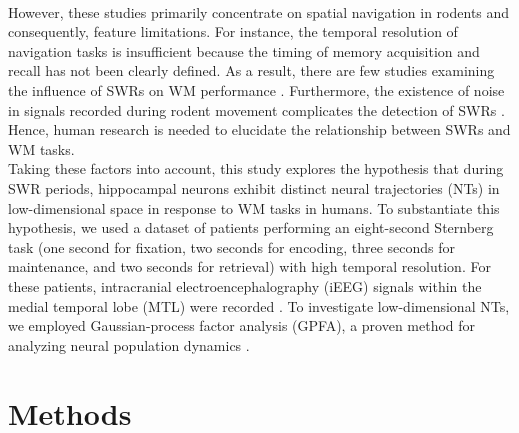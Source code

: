 \documentclass[final,3p,times,twocolumn]{elsarticle}
\begin{document}
\\
\indent
However, these studies primarily concentrate on spatial navigation in rodents and consequently, feature limitations. For instance, the temporal resolution of navigation tasks is insufficient because the timing of memory acquisition and recall has not been clearly defined. As a result, there are few studies examining the influence of SWRs on WM performance \cite{jadhav_awake_2012}. Furthermore, the existence of noise in signals recorded during rodent movement complicates the detection of SWRs \cite{Watanabe_2021}. Hence, human research is needed to elucidate the relationship between SWRs and WM tasks.
\\
\indent
Taking these factors into account, this study explores the hypothesis that during SWR periods, hippocampal neurons exhibit distinct neural trajectories (NTs) in low-dimensional space in response to WM tasks in humans. To substantiate this hypothesis, we used a dataset of patients performing an eight-second Sternberg task (one second for fixation, two seconds for encoding, three seconds for maintenance, and two seconds for retrieval) with high temporal resolution. For these patients, intracranial electroencephalography (iEEG) signals within the medial temporal lobe (MTL) were recorded \cite{boran_dataset_2020}. To investigate low-dimensional NTs, we employed Gaussian-process factor analysis (GPFA), a proven method for analyzing neural population dynamics \cite{yu_gaussian-process_2009}.
\label{sec:introduction}
\section{Methods}
\end{document}
